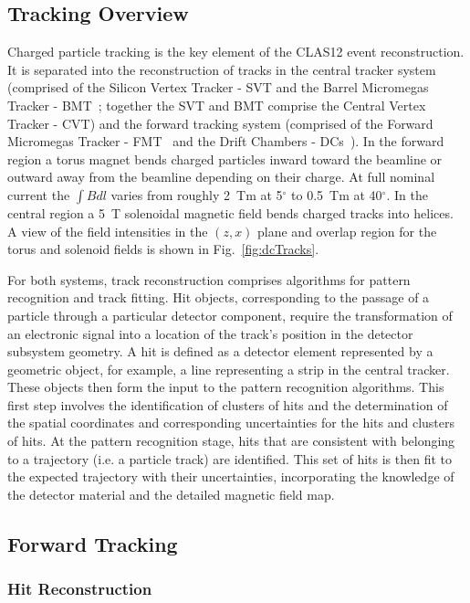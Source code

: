 \subsection{Tracking Overview}

Charged particle tracking is the key element of the CLAS12 event reconstruction. It is separated into the
reconstruction of tracks in the central tracker system (comprised of the Silicon Vertex Tracker - SVT
\cite{svt-nim} and the Barrel Micromegas Tracker - BMT~\cite{mm-nim}; together the SVT and BMT comprise
the Central Vertex Tracker - CVT)  and the forward tracking system (comprised of the Forward Micromegas
Tracker - FMT~\cite{mm-nim} and the Drift Chambers - DCs~\cite{dc-nim}). In the forward region a torus magnet
bends charged particles inward toward the beamline or outward away from the beamline depending on their charge.
At full nominal current the $\int \!\!B dl$ varies from roughly 2~Tm at 5$^\circ$ to 0.5~Tm at 40$^\circ$. In the
central region a 5~T solenoidal magnetic field bends charged tracks into helices. A view of the field intensities in
the $(z,x)$ plane and overlap region for the torus and solenoid fields is shown in Fig.~\ref{fig:dcTracks}.

For both systems, track reconstruction comprises algorithms for pattern recognition and track fitting. Hit objects,
corresponding to the passage of a particle through a particular detector component, require the transformation of an
electronic signal into a location of the track's position in the detector subsystem geometry. A hit is defined as a
detector element represented by a geometric object, for example, a line representing a strip in the central tracker. 
These objects then form the input to the pattern recognition algorithms. This first step involves the identification of
clusters of hits and the determination of the spatial coordinates and corresponding uncertainties for the hits and
clusters of hits. At the pattern recognition stage, hits that are consistent with belonging to a trajectory (i.e. a particle
track) are identified. This set of hits is then fit to the expected trajectory with their uncertainties, incorporating the
knowledge of the detector material and the detailed magnetic field map.

\subsection{Forward Tracking}

\subsubsection{Hit Reconstruction}
\label{sec:hitrecon}


